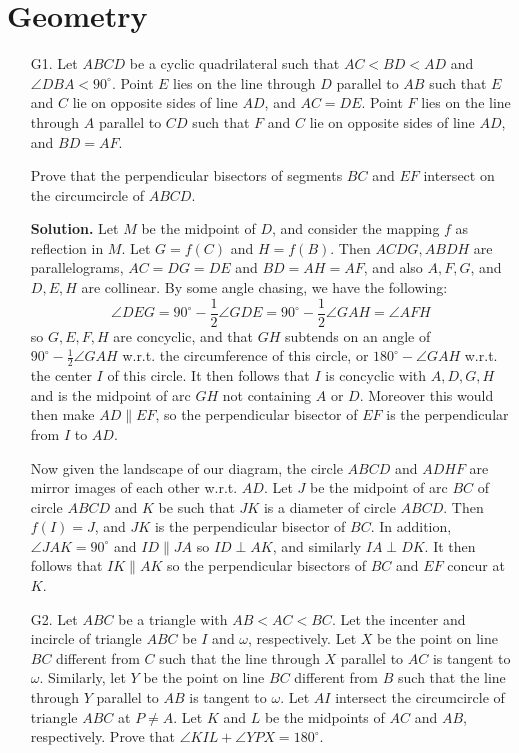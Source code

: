 \documentclass[11pt,a4paper]{article}
\begin{document}
    \section*{Geometry}
    \begin{enumerate}
    	\item [G1.] 
    	Let $ABCD$ be a cyclic quadrilateral such that $AC<BD<AD$ and $\angle DBA<90^\circ$. Point $E$ lies on the line through $D$ parallel to $AB$ such that $E$ and $C$ lie on opposite sides of line $AD$, and $AC=DE$. Point $F$ lies on the line through $A$ parallel to $CD$ such that $F$ and $C$ lie on opposite sides of line $AD$, and $BD=AF$.
    	
    	Prove that the perpendicular bisectors of segments $BC$ and $EF$ intersect on the circumcircle of $ABCD$.
    	
    	\textbf{Solution.} 
    	Let $M$ be the midpoint of $D$, 
    	and consider the mapping $f$ as reflection in $M$. 
    	Let $G=f(C)$ and $H=f(B)$. Then $ACDG, ABDH$ are parallelograms, 
    	$AC=DG=DE$ and $BD=AH=AF$, 
    	and also $A, F, G$, and $D, E, H$ are collinear. 
    	By some angle chasing, we have the following: 
    	\[
    	\angle DEG = 90^{\circ} - \frac12 \angle GDE
    	= 90^{\circ} - \frac12 \angle GAH 
    	= \angle AFH
    	\]
    	so $G, E, F, H$ are concyclic, 
    	and that $GH$ subtends on an angle of 
    	$90^{\circ} - \frac12 \angle GAH$ w.r.t. the circumference of this circle, 
    	or $180^{\circ} - \angle GAH$ w.r.t. the center $I$ of this circle. 
    	It then follows that $I$ is concyclic with $A, D, G, H$ and is the midpoint of arc $GH$ not containing $A$ or $D$. 
    	Moreover this would then make $AD\parallel EF$, 
    	so the perpendicular bisector of $EF$ is the perpendicular from $I$ to $AD$. 
    	
    	Now given the landscape of our diagram, the circle $ABCD$ and $ADHF$ are mirror images of each other w.r.t. $AD$. 
    	Let $J$ be the midpoint of arc $BC$ of circle $ABCD$ and $K$ be such that $JK$ is a diameter of circle $ABCD$. 
    	Then $f(I)=J$, and $JK$ is the perpendicular bisector of $BC$. In addition, 
    	$\angle JAK=90^{\circ}$ and $ID\parallel JA$ so $ID\perp AK$, 
    	and similarly $IA\perp DK$. 
    	It then follows that $IK\parallel AK$ so the perpendicular bisectors of $BC$ and $EF$ concur at $K$. 
    	
    	\item [G2.]
    	Let $ABC$ be a triangle with $AB < AC < BC$. Let the incenter and incircle of triangle $ABC$ be $I$ and $\omega$, respectively. Let $X$ be the point on line $BC$ different from $C$ such that the line through $X$ parallel to $AC$ is tangent to $\omega$. Similarly, let $Y$ be the point on line $BC$ different from $B$ such that the line through $Y$ parallel to $AB$ is tangent to $\omega$. Let $AI$ intersect the circumcircle of triangle $ABC$ at $P \ne A$. Let $K$ and $L$ be the midpoints of $AC$ and $AB$, respectively.
    	Prove that $\angle KIL + \angle YPX = 180^{\circ}$. 
    	

\end{enumerate}
\end{document}

